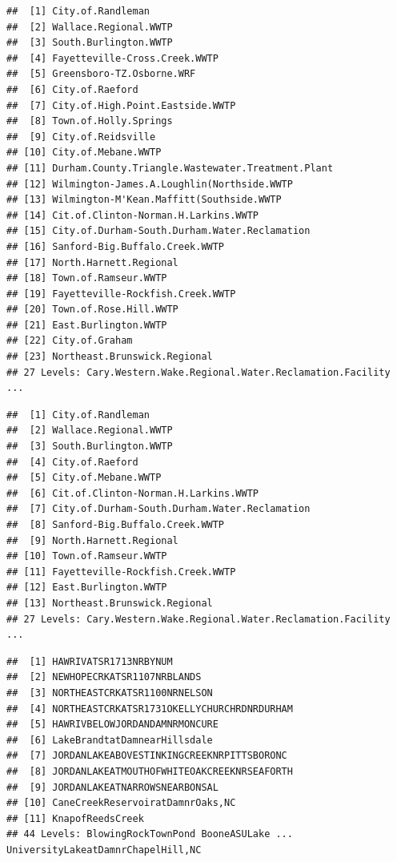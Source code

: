 \documentclass[
  12pt,
]{article}
\begin{document}
\begin{verbatim}
##  [1] City.of.Randleman                                
##  [2] Wallace.Regional.WWTP                            
##  [3] South.Burlington.WWTP                            
##  [4] Fayetteville-Cross.Creek.WWTP                    
##  [5] Greensboro-TZ.Osborne.WRF                        
##  [6] City.of.Raeford                                  
##  [7] City.of.High.Point.Eastside.WWTP                 
##  [8] Town.of.Holly.Springs                            
##  [9] City.of.Reidsville                               
## [10] City.of.Mebane.WWTP                              
## [11] Durham.County.Triangle.Wastewater.Treatment.Plant
## [12] Wilmington-James.A.Loughlin(Northside.WWTP       
## [13] Wilmington-M'Kean.Maffitt(Southside.WWTP         
## [14] Cit.of.Clinton-Norman.H.Larkins.WWTP             
## [15] City.of.Durham-South.Durham.Water.Reclamation    
## [16] Sanford-Big.Buffalo.Creek.WWTP                   
## [17] North.Harnett.Regional                           
## [18] Town.of.Ramseur.WWTP                             
## [19] Fayetteville-Rockfish.Creek.WWTP                 
## [20] Town.of.Rose.Hill.WWTP                           
## [21] East.Burlington.WWTP                             
## [22] City.of.Graham                                   
## [23] Northeast.Brunswick.Regional                     
## 27 Levels: Cary.Western.Wake.Regional.Water.Reclamation.Facility ...
\end{verbatim}

\begin{verbatim}
##  [1] City.of.Randleman                            
##  [2] Wallace.Regional.WWTP                        
##  [3] South.Burlington.WWTP                        
##  [4] City.of.Raeford                              
##  [5] City.of.Mebane.WWTP                          
##  [6] Cit.of.Clinton-Norman.H.Larkins.WWTP         
##  [7] City.of.Durham-South.Durham.Water.Reclamation
##  [8] Sanford-Big.Buffalo.Creek.WWTP               
##  [9] North.Harnett.Regional                       
## [10] Town.of.Ramseur.WWTP                         
## [11] Fayetteville-Rockfish.Creek.WWTP             
## [12] East.Burlington.WWTP                         
## [13] Northeast.Brunswick.Regional                 
## 27 Levels: Cary.Western.Wake.Regional.Water.Reclamation.Facility ...
\end{verbatim}

\begin{verbatim}
##  [1] HAWRIVATSR1713NRBYNUM                     
##  [2] NEWHOPECRKATSR1107NRBLANDS                
##  [3] NORTHEASTCRKATSR1100NRNELSON              
##  [4] NORTHEASTCRKATSR1731OKELLYCHURCHRDNRDURHAM
##  [5] HAWRIVBELOWJORDANDAMNRMONCURE             
##  [6] LakeBrandtatDamnearHillsdale              
##  [7] JORDANLAKEABOVESTINKINGCREEKNRPITTSBORONC 
##  [8] JORDANLAKEATMOUTHOFWHITEOAKCREEKNRSEAFORTH
##  [9] JORDANLAKEATNARROWSNEARBONSAL             
## [10] CaneCreekReservoiratDamnrOaks,NC          
## [11] KnapofReedsCreek                          
## 44 Levels: BlowingRockTownPond BooneASULake ... UniversityLakeatDamnrChapelHill,NC
\end{verbatim}
\end{document}
